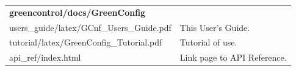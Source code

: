 \noindent
\begin{minipage}{\textwidth}
\begin{tabularx}{\textwidth}{|l|X|}
	\cline{1-1}\cline{2-2}\multicolumn{2}{|l|}{  {\bf greencontrol/docs/GreenConfig}    }\\
	\cline{1-1}\cline{2-2}  users\_guide/latex/GCnf\_Users\_Guide.pdf &            This User's Guide.  \\
	\cline{1-1}\cline{2-2}  tutorial/latex/GreenConfig\_Tutorial.pdf &                 Tutorial of use.  \\
	\cline{1-1}\cline{2-2}  api\_ref/index.html &        Link page to API Reference. \\
	\hline
\end{tabularx}
\end{minipage}

\vspace{1 cm}

